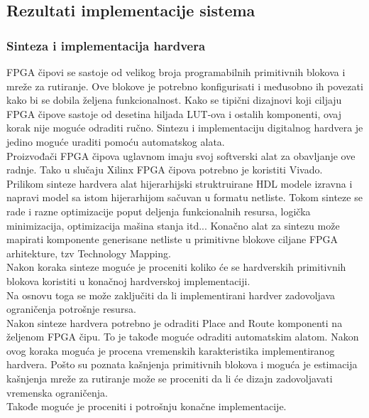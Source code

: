 


\subsection{Rezultati implementacije sistema}

\subsubsection{Sinteza i implementacija hardvera}
FPGA čipovi se sastoje od velikog broja programabilnih primitivnih blokova i
mreže za rutiranje.
Ove blokove je potrebno konfigurisati i međusobno ih povezati kako bi se dobila
željena funkcionalnost.
Kako se tipični dizajnovi koji ciljaju FPGA čipove sastoje od desetina hiljada
LUT-ova i ostalih komponenti, ovaj korak nije moguće odraditi ručno.
Sintezu i implementaciju digitalnog hardvera je jedino moguće uraditi pomoću
automatskog alata. \\

Proizvođači FPGA čipova uglavnom imaju svoj softverski alat za obavljanje ove
radnje.
Tako u slučaju Xilinx FPGA čipova potrebno je koristiti Vivado.\\

Prilikom sinteze hardvera alat hijerarhijski struktruirane HDL modele izravna i
napravi model sa istom hijerarhijom sačuvan u formatu netliste.
Tokom sinteze se rade i razne optimizacije poput deljenja funkcionalnih resursa,
logička minimizacija, optimizacija mašina stanja itd...
Konačno alat za sintezu može mapirati komponente generisane netliste u
primitivne blokove ciljane FPGA arhitekture, tzv Technology Mapping. \\
Nakon koraka sinteze moguće je proceniti koliko će se hardverskih primitivnih
blokova koristiti u konačnoj hardverskoj implementaciji. \\
Na osnovu toga se može zaključiti da li implementirani hardver zadovoljava
ograničenja potrošnje resursa. \\

Nakon sinteze hardvera potrebno je odraditi Place and Route komponenti na
željenom FPGA čipu.
To je takođe moguće odraditi automatskim alatom.
Nakon ovog koraka moguća je procena vremenskih karakteristika implementiranog
hardvera.
Pošto su poznata kašnjenja primitivnih blokova i moguća je estimacija kašnjenja
mreže za rutiranje može se proceniti da li će dizajn zadovoljavati vremenska
ograničenja. \\
Takođe moguće je proceniti i potrošnju konačne implementacije. \\

